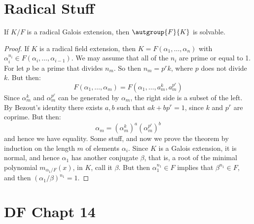 \documentclass{article}                                                        %
\begin{document}
    \section{Radical Stuff}
        \begin{theorem}
            If $K/F$ is a radical Galois extension, then $\autgroup{F}{K}$
            is solvable.
        \end{theorem}
        \begin{proof}
            If $K$ is a radical field extension, then
            $K=F(\alpha_{1},\dots,\alpha_{n})$ with
            $\alpha_{i}^{n_{i}}\in{F}(\alpha_{i},\dots,\alpha_{i-1})$. We may
            assume that all of the $n_{i}$ are prime or equal to 1. For let
            $p$ be a prime that divides $n_{m}$. So then
            $n_{m}=p^{r}k$, where $p$ does not divide $k$. But then:
            \begin{equation}
                F(\alpha_{1},\dots,\alpha_{m})
                    =F(\alpha_{1},\dots,a_{m}^{k},a_{m}^{p^{r}})
            \end{equation}
            Since $\alpha_{m}^{k}$ and $\alpha_{m}^{p^{r}}$ can be generated
            by $\alpha_{m}$, the right side is a subset of the left. By Bezout's
            identity there exists $a,b$ such that $ak+bp^{r}=1$, since
            $k$ and $p^{r}$ are coprime. But then:
            \begin{equation}
                \alpha_{m}=(\alpha_{m}^{k})^{a}(\alpha_{m}^{p^{r}})^{b}
            \end{equation}
            and hence we have equality. Some stuff, and now we prove the theorem
            by induction on the length $m$ of elements $\alpha_{i}$. Since $K$
            is a Galois extension, it is normal, and hence $\alpha_{1}$ has
            another conjugate $\beta$, that is, a root of the minimal polynomial
            $m_{\alpha_{1}/F}(x)$, in $K$, call it $\beta$. But then
            $\alpha_{1}^{n_{1}}\in{F}$ implies that $\beta^{n_{1}}\in{F}$, and
            then $(\alpha_{1}/\beta)^{n_{1}}=1$.
        \end{proof}
    \section{DF Chapt 14}
        
\end{document}
